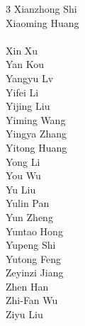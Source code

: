 {\begin{multicols}{3}
Xianzhong Shi\\
Xiaoming Huang\\
\\
Xin Xu\\
Yan Kou\\
Yangyu Lv\\
Yifei Li\\
Yijing Liu\\
Yiming Wang\\
Yingya Zhang\\
Yitong Huang\\
Yong Li\\
You Wu\\
Yu Liu\\
Yulin Pan\\
Yun Zheng\\
Yuntao Hong\\
Yupeng Shi\\
Yutong Feng\\
Zeyinzi Jiang\\
Zhen Han\\
Zhi-Fan Wu\\
Ziyu Liu
\end{multicols}}

\clearpage
